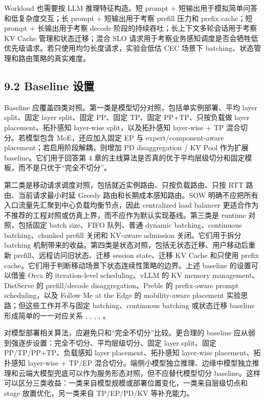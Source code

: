 Workload 也需要按 LLM 推理特征构造。短 prompt + 短输出用于模拟简单问答和低复杂度交互；长 prompt + 短输出用于考察 prefill 压力和 prefix cache；短 prompt + 长输出用于考察 decode 阶段的持续吞吐；长上下文多轮会话用于考察 KV Cache 管理和状态迁移；混合 SLO 请求用于考察业务感知调度是否会牺牲低优先级请求。若只使用均匀长度请求，实验会低估 CEC 场景下 batching、状态管理和路由策略的真实难度。


\subsection*{9.2 Baseline 设置}

Baseline 应覆盖四类对照。第一类是模型切分对照，包括单实例部署、平均 layer split、固定 layer split、固定 PP、固定 TP、固定 PP+TP、只按负载做 layer placement、拓扑感知 layer-wise split，以及拓扑感知 layer-wise + TP 混合切分。若模型包含 MoE，还应加入固定 EP 与 expert/component-aware placement；若启用阶段解耦，则增加 PD disaggregation / KV Pool 作为扩展 baseline。它们用于回答第 4 章的主线算法是否真的优于平均层级切分和固定模板，而不是只优于“完全不切分”。

第二类是移动请求调度对照，包括就近实例路由、只按负载路由、只按 RTT 路由、当前请求最小时延 Greedy 路由和长期成本感知路由。SOW 明确不应把所有入口流量先汇聚到中心负载均衡节点，因此 centralized load balancer 更适合作为不推荐的工程对照或仿真上界，而不应作为默认实现基线。第三类是 runtime 对照，包括固定 batch size、FIFO 队列、普通 dynamic batching、continuous batching、chunked prefill 关闭和 KV-aware admission 关闭。它们用于拆分 batching 机制带来的收益。第四类是状态对照，包括无状态迁移、用户移动后重新 prefill、远程访问旧状态、迁移 session state、迁移 KV Cache 和只使用 prefix cache。它们用于判断移动场景下状态连续性策略的边界。上述 baseline 的设置可以借鉴 Orca 的 iteration-level scheduling、vLLM 的 KV memory management、DistServe 的 prefill/decode disaggregation、Preble 的 prefix-aware prompt scheduling，以及 Follow Me at the Edge 的 mobility-aware placement 实验思路；但这些工作并不与固定 batching、continuous batching 或状态迁移 baseline 形成简单的一一对应关系 \cite{yu2022orca}, \cite{kwon2023efficient}, \cite{zhong2024distserve}, \cite{srivatsa2025preble}, \cite{ouyang2018follow}。

对模型部署相关算法，应避免只和“完全不切分”比较。更合理的 baseline 应从弱到强逐步设置：完全不切分、平均层级切分、固定 layer split、固定 PP/TP/PP+TP、负载感知 layer placement、拓扑感知 layer-wise placement、拓扑感知 layer-wise + TP/EP 混合切分。端侧小模型独立推理、边缘中模型独立推理和云端大模型兜底可以作为服务形态对照，但不应替代模型切分 baseline。这样可以区分三类收益：一类来自模型规模或部署位置变化，一类来自层级切点和 stage 放置优化，另一类来自 TP/EP/PD/KV 等补充能力。

